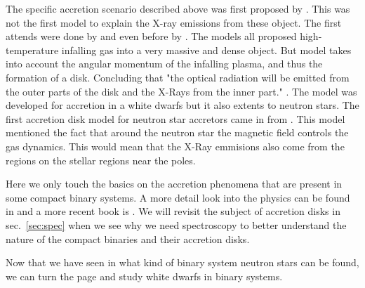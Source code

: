 The specific accretion scenario described above was first proposed by \cite{acre68}. This was not the first model to explain the X-ray emissions from these object. The first attends were done by \cite{shklovskii_nature_1967} and even before by \cite{hayakawa64}. The models all proposed high-temperature infalling gas into a very massive and dense object. But \cite{acre68} model takes into account the angular momentum of the infalling plasma, and thus the formation of a disk. Concluding that "the optical radiation will be emitted from the outer parts of the disk and the X-Rays from the inner part." \citep{acre68}. The model was developed for accretion in a white dwarfs but it also extents to neutron stars. The first accretion disk model for neutron star accretors came in \citeyear{pringle_accretion_1972} from \citeauthor{pringle_accretion_1972}. This model mentioned the fact that around the neutron star the magnetic field controls the gas dynamics. This would mean that the X-Ray emmisions also come from the regions on the stellar regions near the poles. 

Here we only touch the basics on the accretion phenomena that are present in some compact binary systems. A more detail look into the physics can be found in \cite{pringle_accretion_1981} and a more recent book is \cite{frank_accretion_2002}. We will revisit the subject of accretion disks in sec.~\ref{sec:spec} when we see why we need spectroscopy to better understand the nature of the compact binaries and their accretion disks. 

Now that we have seen in what kind of binary system neutron stars can be found, we can turn the page and study white dwarfs in binary systems.   




